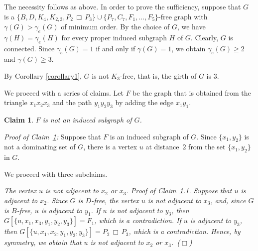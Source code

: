\documentclass[12pt]{article}
\newtheorem{claim}{Claim}
\newcommand{\smallqed}{{\tiny ($\Box$)}}
\newcommand{\cart}{\, \Box \,}
\newenvironment{unnumbered}[1]{\trivlist \item [\hskip \labelsep {\bf
#1}]\ignorespaces\it}{\endtrivlist}
\begin{document}
The necessity follows as above.
In order to prove the sufficiency, suppose that $G$ is a
$\{ B,D, K_4,K_{2,3},P_2 \cart  P_3\}\cup\{ P_7, C_7, F_1,\dots, F_5\}$-free graph
with $\gamma(G)>\gamma_e(G)$ of minimum order.
By the choice of $G$, we have $\gamma(H) = \gamma_e(H)$ for every proper induced subgraph $H$ of $G$.
Clearly, $G$ is connected.
Since $\gamma_e(G)=1$ if and only if $\gamma(G)=1$,
we obtain $\gamma_e(G)\geq 2$ and $\gamma(G)\geq 3$.

By Corollary \ref{corollary1}, $G$ is not $K_3$-free, that is, the girth of $G$ is $3$.

We proceed with a series of claims.
Let $F$ be the graph that is obtained from the triangle $x_1x_2x_3$ and the path $y_1y_2y_3$ by adding the edge $x_1y_1$.

\begin{claim}\label{claim1}
$F$ is not an induced subgraph of $G$.
\end{claim}
{\it Proof of Claim~\ref{claim1}:}
Suppose that $F$ is an induced subgraph of $G$.
Since $\{x_1, y_2\}$ is not a dominating set of $G$, there is a vertex $u$ at distance~$2$ from the set $\{x_1,y_2\}$ in $G$. 

We proceed with three subclaims.

\begin{unnumbered}{Claim~\ref{claim1}.1}
The vertex $u$ is not adjacent to $x_2$ or $x_3$.
\end{unnumbered}
{\it Proof of Claim~\ref{claim1}.1.} Suppose that $u$ is adjacent to $x_2$.
Since $G$ is $D$-free, the vertex $u$ is not adjacent to $x_3$, and,
since $G$ is $B$-free, $u$ is adjacent to $y_1$.
If $u$ is not adjacent to $y_3$, then $G[\{u,x_1, x_3, y_1, y_2, y_3\}]=F_1$, which is a contradiction.
If $u$ is adjacent to $y_3$, then $G[\{u,x_1, x_2, y_1, y_2, y_3\}]=P_2 \cart P_3$, which is a contradiction.
Hence, by symmetry, we obtain that $u$ is not adjacent to $x_2$ or $x_3$.~\smallqed
\end{document}
